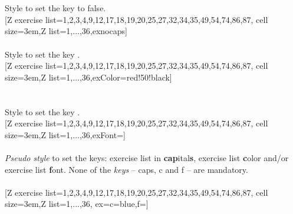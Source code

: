 \\ [10pt]\makebox[\linewidth][c]{\scalebox{.6}{\pgfPT[cells+p+g+Z]}}%
\\ [5pt]\pgfPTendstyle%
%
{Style to set the key  to false.
}%
\\ [5pt][Z exercise list={1,2,3,4,9,12,17,18,19,20,25,27,32,34,35,49,54,74,86,87}, cell size=3em,Z list={1,...,36},exnocaps]%
\\ [10pt]\makebox[\linewidth][c]{\scalebox{.6}{\pgfPT[Z exercise list={1,2,3,4,9,12,17,18,19,20,25,27,32,34,35,49,54,74,86,87}, cell size=3em,Z list={1,...,36},exnocaps]}}%
\\ [5pt]\pgfPTendstyle%
%
{Style to set the key .
}%
\\ [5pt][Z exercise list={1,2,3,4,9,12,17,18,19,20,25,27,32,34,35,49,54,74,86,87}, cell size=3em,Z list={1,...,36},exColor=red!50!black]%
\\ [10pt]\makebox[\linewidth][c]{\scalebox{.6}{\pgfPT[Z exercise list={1,2,3,4,9,12,17,18,19,20,25,27,32,34,35,49,54,74,86,87}, cell size=3em,Z list={1,...,36},exColor=red!50!black]}}%
\\ [5pt]\pgfPTendstyle%
\newpage\ \\ [-25pt]%
%
{Style to set the key .
}%
\\ [5pt][Z exercise list={1,2,3,4,9,12,17,18,19,20,25,27,32,34,35,49,54,74,86,87}, cell size=3em,Z list={1,...,36},exFont=\string\Large]%
\\ [10pt]\makebox[\linewidth][c]{\scalebox{.6}{\pgfPT[Z exercise list={1,2,3,4,9,12,17,18,19,20,25,27,32,34,35,49,54,74,86,87}, cell size=3em,Z list={1,...,36},exFont=\Large]}}%
\\ [0pt]\pgfPTendstyle%
%
{\textit{Pseudo style} to set the keys: exercise list in \textbf{cap}ital\textbf{s}, exercise list \textbf{c}olor and/or exercise list \textbf{f}ont. %
None of the \textit{keys} -- caps, c and f -- are mandatory.
\\ [3pt]%
}%
\\ [5pt][Z exercise list={1,2,3,4,9,12,17,18,19,20,25,27,32,34,35,49,54,74,86,87}, cell size=3em,Z list={1,...,36},%
ex={c=blue,f=\string\Large\string\bfseries}]%
\\ [10pt]\makebox[\linewidth][c]{\scalebox{.6}{\pgfPT[Z exercise list={1,2,3,4,9,12,17,18,19,20,25,27,32,34,35,49,54,74,86,87}, cell size=3em,Z list={1,...,36},%
ex={c=blue, f=\Large\bfseries}]}}%
\\ [0pt]\pgfPTendstyle%
\endinput
